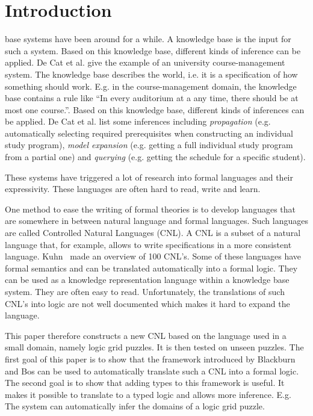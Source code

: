 \section{Introduction}

 base systems have been around for a while. A knowledge base is the input for such a system. Based on this knowledge base, different kinds of inference can be applied. De Cat et al. \cite{IDP} give the example of an university course-management system. The knowledge base describes the world, i.e. it is a specification of how something should work. E.g. in the course-management domain, the knowledge base contains a rule like ``In every auditorium at a any time, there should be at most one course.''. Based on this knowledge base, different kinds of inferences can be applied. De Cat et al. list some inferences including \textit{propagation} (e.g. automatically selecting required prerequisites when constructing an individual study program), \textit{model expansion} (e.g. getting a full individual study program from a partial one) and \textit{querying} (e.g. getting the schedule for a specific student).

These systems have triggered a lot of research into formal languages and their expressivity. These languages are often hard to read, write and learn.

One method to ease the writing of formal theories is to develop languages that are somewhere in between natural language and formal languages. Such languages are called Controlled Natural Languages (CNL). A CNL is a subset of a natural language that, for example, allows to write specifications in a more consistent language. Kuhn~\cite{Kuhn2014} made an overview of 100 CNL's. Some of these languages have formal semantics and can be translated automatically into a formal logic. They can be used as a knowledge representation language within a knowledge base system. They are often easy to read. Unfortunately, the translations of such CNL's into logic are not well documented which makes it hard to expand the language.

This paper therefore constructs a new CNL based on the language used in a small domain, namely logic grid puzzles. It is then tested on unseen puzzles. The first goal of this paper is to show that the framework introduced by Blackburn and Bos \cite{Blackburn2005, Blackburn2006} can be used to automatically translate such a CNL into a formal logic. The second goal is to show that adding types to this framework is useful. It makes it possible to translate to a typed logic and allows more inference. E.g. The system can automatically infer the domains of a logic grid puzzle.

